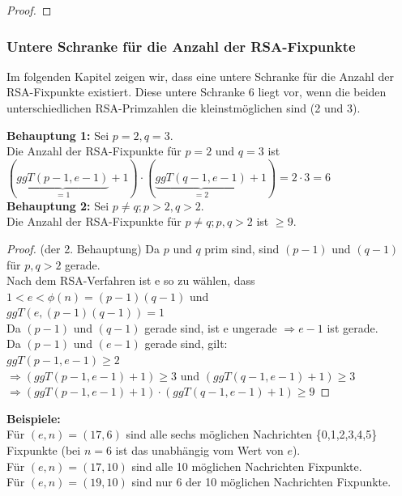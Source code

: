 \begin{refsegment}
\begin{proof}{}
\end{proof}
\vspace{15pt}



\subsubsection{Untere Schranke für die Anzahl der RSA-Fixpunkte}
Im folgenden Kapitel zeigen wir, dass eine untere Schranke für die Anzahl der RSA-Fixpunkte
existiert. Diese untere Schranke $6$ liegt vor, wenn die beiden unterschiedlichen
RSA-Primzahlen die kleinstmöglichen sind (2 und 3).

\textbf{Behauptung 1:} Sei $p = 2, q = 3$.\\
Die Anzahl der RSA-Fixpunkte für $p=2$ und $q=3$ ist\\
$(\underbrace{ggT(p-1, e-1)}_{=1}+1) \cdot (\underbrace{ggT(q-1, e-1)}_{=2}+1)=2 \cdot 3=6$\\

\textbf{Behauptung 2:} Sei $p \neq q; p > 2,q > 2$.\\
Die Anzahl der RSA-Fixpunkte für $p \neq q; p,q > 2$ ist $\geq 9$.

\begin{proof}{(der 2. Behauptung)}
Da $p$ und $q$ prim sind, sind $(p-1)$ und $(q-1)$ für $ p,q > 2 $ gerade.\\
Nach dem RSA-Verfahren ist e so zu wählen, dass $1 < e < \phi(n)=(p-1)(q-1)$ und\\
$ggT(e,(p-1)(q-1))=1$\\
Da $(p-1)$ und $(q-1)$ gerade sind, ist e ungerade $ \Rightarrow e-1$ ist gerade.\\
Da $(p-1)$ und $(e-1)$ gerade sind, gilt:\\
$ggT(p-1, e-1) \geq 2$\\
$\Rightarrow (ggT(p-1, e-1)+1) \geq 3$ und $(ggT(q-1, e-1)+1) \geq 3$\\
$\Rightarrow (ggT(p-1, e-1)+1) \cdot (ggT(q-1, e-1)+1) \geq 9$
\end{proof}

\vspace{\baselineskip}
 \textbf{Beispiele:}\\
Für $(e,n)=(17,6)$ sind alle sechs möglichen Nachrichten \{0,1,2,3,4,5\} Fixpunkte (bei $n=6$ ist das unabhängig vom Wert von $e$).\\
Für $(e,n)=(17,10)$ sind alle 10 möglichen Nachrichten Fixpunkte.\\
Für $(e,n)=(19,10)$ sind nur 6 der 10 möglichen Nachrichten Fixpunkte.




\end{refsegment}
